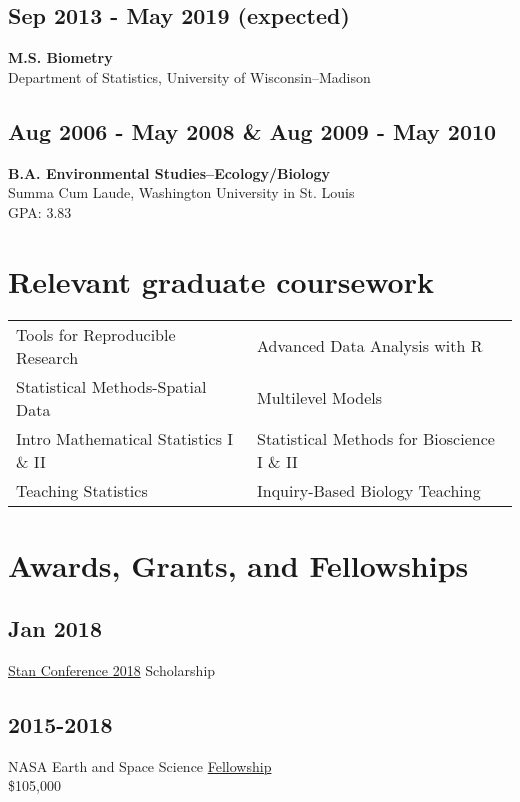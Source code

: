 \documentclass{article}
\begin{document}
\subsection*{Sep 2013 - May 2019 (expected)}
\label{sec:org3a4c5df}
\textbf{M.S. Biometry} \\
Department of Statistics, University of Wisconsin--Madison

\subsection*{Aug 2006 - May 2008 \& Aug 2009 - May 2010}
\label{sec:org18fe395}
\textbf{B.A. Environmental Studies--Ecology/Biology} \\
Summa Cum Laude, Washington University in St. Louis \\
GPA: 3.83

\section*{Relevant graduate coursework}
\label{sec:org289f8e9}
\begin{center}
\begin{tabular}{ll}
Tools for Reproducible Research & Advanced Data Analysis with R\\
Statistical Methods-Spatial Data & Multilevel Models\\
Intro Mathematical Statistics I \& II & Statistical Methods for Bioscience I \& II\\
Teaching Statistics & Inquiry-Based Biology Teaching\\
\end{tabular}
\end{center}

\section*{Awards, Grants, and Fellowships}
\label{sec:orge180409}
\subsection*{Jan 2018}
\label{sec:org46f3cd9}
\href{http://mc-stan.org/events/}{Stan Conference 2018} Scholarship

\subsection*{2015-2018}
\label{sec:org8eb9562}
NASA Earth and Space Science \href{https://nspires.nasaprs.com/external/viewrepositorydocument/cmdocumentid=459947/solicitationId=\%7BB6CDCEA6-8EDD-A48A-FAF8-E588F66661C3\%7D/viewSolicitationDocument=1/NESSF15\%20selections.pdf}{Fellowship}\\
\$105,000
\end{document}
